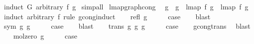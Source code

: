 \begin{isabellebody}
%
\isadelimproof
%
\endisadelimproof
%
\isatagproof
{}\isamarkupfalse%
\ {\isacharparenleft}{\kern0pt}induct\ G\ arbitrary{\isacharcolon}{\kern0pt}\ f\ g{\isacharparenright}{\kern0pt}\isanewline
{}\isamarkupfalse%
\ simp{\isacharunderscore}{\kern0pt}all%
\endisatagproof
{\isafoldproof}%
%
\isadelimproof
\isanewline
%
\endisadelimproof
\isanewline
\isanewline
{}\isamarkupfalse%
\ lmap{\isacharunderscore}{\kern0pt}graph{\isacharunderscore}{\kern0pt}cong{\isacharcolon}{\kern0pt}\isanewline
\ \ {\isachardoublequoteopen}g{}\ {\isasymsimeq}\ g{}\ {\isacharequal}{\kern0pt}{\isacharequal}{\kern0pt}{\isachargreater}{\kern0pt}\ lmap\ f\ g{}\ {\isasymsimeq}\ lmap\ f\ g{}{\isachardoublequoteclose}\isanewline
%
\isadelimproof
%
\endisadelimproof
%
\isatagproof
{}\isamarkupfalse%
\ {\isacharparenleft}{\kern0pt}induct\ arbitrary{\isacharcolon}{\kern0pt}\ f\ rule{\isacharcolon}{\kern0pt}\ gcong{\isachardot}{\kern0pt}induct{\isacharparenright}{\kern0pt}\isanewline
\ \ \isamarkupfalse%
\ {\isacharparenleft}{\kern0pt}refl\ g{\isacharparenright}{\kern0pt}\isanewline
\ \ \isamarkupfalse%
\ \isamarkupfalse%
\ {\isacharquery}{\kern0pt}case\isanewline
\ \ \isamarkupfalse%
\ blast\isanewline
{}\isamarkupfalse%
\isanewline
\ \ \isamarkupfalse%
\ {\isacharparenleft}{\kern0pt}sym\ g{}\ g{}{\isacharparenright}{\kern0pt}\isanewline
\ \ \isamarkupfalse%
\ \isamarkupfalse%
\ {\isacharquery}{\kern0pt}case\isanewline
\ \ \isamarkupfalse%
\ blast\isanewline
{}\isamarkupfalse%
\isanewline
\ \ \isamarkupfalse%
\ {\isacharparenleft}{\kern0pt}trans\ g{}\ g{}\ g{}{\isacharparenright}{\kern0pt}\isanewline
\ \ \isamarkupfalse%
\ \isamarkupfalse%
\ {\isacharquery}{\kern0pt}case\isanewline
\ \ \isamarkupfalse%
\ gcong{\isachardot}{\kern0pt}trans\ \isamarkupfalse%
\ blast\isanewline
{}\isamarkupfalse%
\isanewline
\ \ \isamarkupfalse%
\ {\isacharparenleft}{\kern0pt}mol{\isacharunderscore}{\kern0pt}zero\ g{\isacharparenright}{\kern0pt}\isanewline
\ \ \isamarkupfalse%
\ \isamarkupfalse%
\ {\isacharquery}{\kern0pt}case\isanewline
\ \ \isamarkupfalse%

\end{isabellebody}
